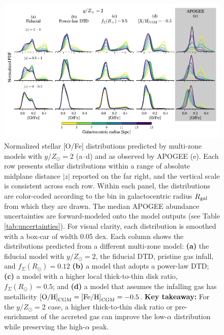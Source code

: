 \documentclass[twocolumn,twocolappendix,linenumbers]{aastex631}
\newcommand{\mathOH}{{\rm [O/H]}}
\newcommand{\mathFeH}{{\rm [Fe/H]}}
\newcommand{\yZ}[1]{$y/Z_\odot=#1$}
\begin{document}
\begin{figure}
    \centering
    \includegraphics[width=\textwidth]{src/tex/figures/ofe_distributions.pdf}
    \caption{Normalized stellar [O/Fe] distributions predicted by multi-zone models with \yZ{2} (a--d) and as observed by APOGEE (e). 
    Each row presents stellar distributions within a range of absolute midplane distance $|z|$ reported on the far right, and the vertical scale is consistent across each row. Within each panel, the distributions are color-coded according to the bin in galactocentric radius $R_{\rm gal}$ from which they are drawn. The median APOGEE abundance uncertainties are forward-modeled onto the model outputs (see Table \ref{tab:uncertainties}). For visual clarity, each distribution is smoothed with a box-car of width 0.05 dex.
    Each column shows the distributions predicted from a different multi-zone model: {\bf (a)} the fiducial model with \yZ{2}, the fiducial DTD, pristine gas infall, and $f_\Sigma(R_\odot)=0.12$
    {\bf (b)} a model that adopts a power-law DTD; {\bf (c)} a model with a higher local thick-to-thin disk ratio, $f_\Sigma(R_\odot)=0.5$; and {\bf (d)} a model that assumes the infalling gas has metallicity $\mathOH_{\rm CGM}=\mathFeH_{\rm CGM}=-0.5$. {\bf Key takeaway:} For the \yZ{2} case, a higher thick-to-thin disk ratio or pre-enrichment of the accreted gas can improve the low-$\alpha$ distribution while preserving the high-$\alpha$ peak.}
    \label{fig:ofe-distribution-parameters}
\end{figure}
\end{document}
